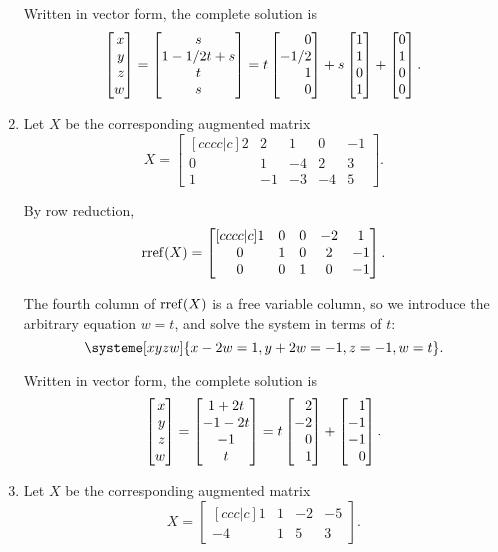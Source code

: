 \begin{exercises}
\begin{problist}
\begin{solution}
\begin{enumerate}
				Written in vector form, the complete solution is
				\[
					\mat{x\\y\\z\\w} = \matc{s\\1-1/2t+s\\t\\s} = t\mat{0\\-1/2\\1\\0}+s\mat{1\\1\\0\\1}+\mat{0\\1\\0\\0}.
				\]
				\item 
				Let $X$ be the corresponding augmented matrix
				\[
					X=
					\begin{bmatrix}[cccc|c]
						2 & 2 & 1 & 0 & -1\\
						0 & 1 & -4 & 2 & 3\\
						1 & -1 & -3 & -4 & 5
					\end{bmatrix}.
				\]
				
				By row reduction,
				\[
					\operatorname{rref}(X)=
					\begin{bmatrix}[cccc|c]
						1 & 0 & 0 & -2 & 1\\
						0 & 1 & 0 & 2 & -1\\
						0 & 0 & 1 & 0 & -1
					\end{bmatrix}.
				\]
				
				The fourth column of $\operatorname{rref}(X)$ is a free variable column, so we introduce the arbitrary equation $w=t$, and solve the system in terms of $t$:
				\[
					\systeme[xyzw]{x-2w=1,y+2w=-1,z=-1,w=t}.
				\]
				
				Written in vector form, the complete solution is
				\[
				\mat{x\\y\\z\\w} = \matc{1+2t\\-1-2t\\-1\\t} = t\mat{2\\-2\\0\\1}+\mat{1\\-1\\-1\\0}.
				\]
				\item 
				Let $X$ be the corresponding augmented matrix
				\[
					X=
					\begin{bmatrix}[ccc|c]
						1 & 1 & -2 & -5\\
						-4 & 1 & 5 & 3
					\end{bmatrix}.
				\]
				

\end{enumerate}
\end{solution}
\end{problist}
\end{exercises}
